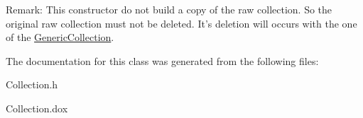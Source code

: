 \begin{DoxyParagraph}{Remark\-:}
This constructor do not build a copy of the raw collection. So the original raw collection must not be deleted. It's deletion will occurs with the one of the \hyperlink{classHurricane_1_1GenericCollection}{Generic\-Collection}. 
\end{DoxyParagraph}


The documentation for this class was generated from the following files\-:\begin{DoxyCompactItemize}
\item 
Collection.\-h\item 
Collection.\-dox\end{DoxyCompactItemize}
